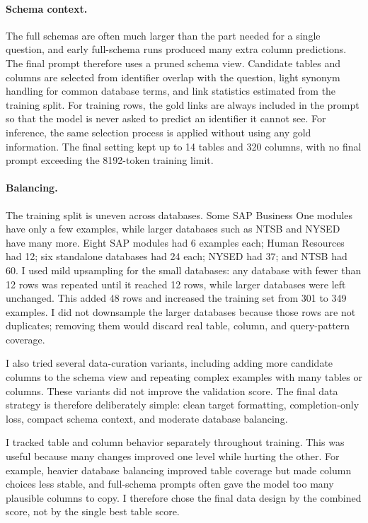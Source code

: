 \documentclass{article}
\begin{document}
\paragraph{Schema context.}
The full schemas are often much larger than the part needed for a single question, and early full-schema
runs produced many extra column predictions. The final prompt therefore uses a pruned schema view.
Candidate tables and columns are selected from identifier overlap with the question, light synonym
handling for common database terms, and link statistics estimated from the training split. For training
rows, the gold links are always included in the prompt so that the model is never asked to predict an
identifier it cannot see. For inference, the same selection process is applied without using any gold
information. The final setting kept up to 14 tables and 320 columns, with no final prompt exceeding
the 8192-token training limit.

\paragraph{Balancing.}
The training split is uneven across databases. Some SAP Business One modules have only a few
examples, while larger databases such as NTSB and NYSED have many more. Eight SAP modules
had 6 examples each; Human Resources had 12; six standalone databases had 24 each; NYSED had
37; and NTSB had 60. I used mild upsampling for the small databases: any database with fewer than
12 rows was repeated until it reached 12 rows, while larger databases were left unchanged. This added
48 rows and increased the training set from 301 to 349 examples. I did not downsample the larger
databases because those rows are not duplicates; removing them would discard real table, column,
and query-pattern coverage.

I also tried several data-curation variants, including adding more candidate columns to the schema
view and repeating complex examples with many tables or columns. These variants did not improve
the validation score. The final data strategy is therefore deliberately simple: clean target formatting,
completion-only loss, compact schema context, and moderate database balancing.

I tracked table and column behavior separately throughout training. This was useful because many
changes improved one level while hurting the other. For example, heavier database balancing improved
table coverage but made column choices less stable, and full-schema prompts often gave the model
too many plausible columns to copy. I therefore chose the final data design by the combined score,
not by the single best table score.
\end{document}
